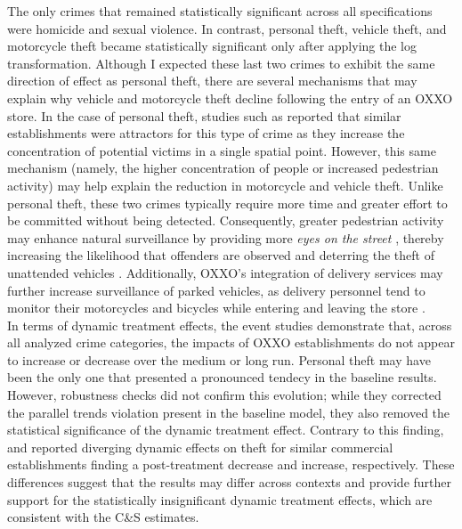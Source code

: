 \documentclass[12pt]{article}
\begin{document}
The only crimes that remained statistically significant across all specifications were homicide and sexual violence. In contrast, personal theft, vehicle theft, and motorcycle theft became statistically significant only after applying the log transformation. Although I expected these last two crimes to exhibit the same direction of effect as personal theft, there are several mechanisms that may explain why vehicle and motorcycle theft decline following the entry of an OXXO store. In the case of personal theft, studies such as \textcite{askey2018fast, Dugato2026, Brantingham1995} reported that similar establishments were attractors for this type of crime as they increase the concentration of potential victims in a single spatial point. However, this same mechanism (namely, the higher concentration of people or increased pedestrian activity) may help explain the reduction in motorcycle and vehicle theft. Unlike personal theft, these two crimes typically require more time and greater effort to be committed without being detected. Consequently, greater pedestrian activity may enhance natural surveillance by providing more \textit{eyes on the street} \parencite{jacobs1961death}, thereby  increasing the likelihood that offenders are observed and deterring the theft of unattended vehicles \parencite{kefayat2025urban, jaramillo2021low}. Additionally, OXXO’s integration of delivery services \parencite{OxxoTyC2026} may further increase surveillance of parked vehicles, as delivery personnel tend to monitor their motorcycles and bicycles while entering and leaving the store \parencite{zhou2025delivery}.\\

In terms of dynamic treatment effects, the event studies demonstrate that, across all analyzed crime categories, the impacts of OXXO establishments do not appear to increase or decrease over the medium or long run. Personal theft may have been the only one that presented a pronounced tendecy in the baseline results. However, robustness checks did not confirm this evolution; while they corrected the parallel trends violation present in the baseline model, they also removed the statistical significance of the dynamic treatment effect. Contrary to this finding, \textcite{jaramillo2021low} and \textcite{shin2024dollar} reported diverging dynamic effects on theft for similar commercial establishments finding a post-treatment decrease and increase, respectively. These differences suggest that the results may differ across contexts and provide further support for the statistically insignificant dynamic treatment effects, which are consistent with the C\&S estimates.\\
\end{document}
